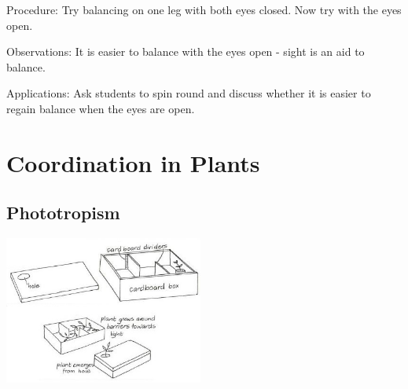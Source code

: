 \begin{multicols}{2}
\begin{description*}
\item[Procedure:]{Try balancing on one leg with
both eyes closed. Now try with
the eyes open. }
\item[Observations:]{It is easier to
balance with the eyes open -
sight is an aid to balance.}
\item[Applications:]{Ask students to spin round and
discuss whether it is easier to
regain balance when the eyes are
open.}
\end{description*}

\columnbreak


\section*{Coordination in Plants}


\subsection{Phototropism}

\begin{center}
\includegraphics[width=0.49\textwidth]{./img/vso/phototropism.jpg}
\end{center}


\end{multicols}
